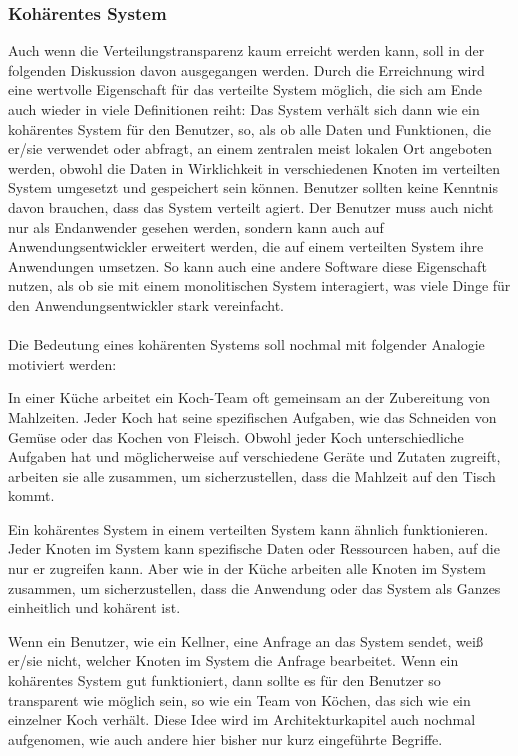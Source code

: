 \subsubsection{Kohärentes System}
Auch wenn die Verteilungstransparenz kaum erreicht werden kann, soll in der folgenden Diskussion davon ausgegangen werden. Durch die Erreichnung wird eine wertvolle Eigenschaft für das verteilte System möglich, die sich am Ende auch wieder in viele Definitionen reiht: Das System verhält sich dann wie ein kohärentes System für den Benutzer, so, als ob alle Daten und Funktionen, die er/sie verwendet oder abfragt, an einem zentralen meist lokalen Ort angeboten werden, obwohl die Daten in Wirklichkeit in verschiedenen Knoten im verteilten System umgesetzt und gespeichert sein können. Benutzer sollten keine Kenntnis davon brauchen, dass das System verteilt agiert. Der Benutzer muss auch nicht nur als Endanwender gesehen werden, sondern kann auch auf Anwendungsentwickler erweitert werden, die auf einem verteilten System ihre Anwendungen umsetzen. 
So kann auch eine andere Software diese Eigenschaft nutzen, als ob sie mit einem monolitischen System interagiert, was viele Dinge für den Anwendungsentwickler stark vereinfacht. 
\\\\
Die Bedeutung eines kohärenten Systems soll nochmal mit folgender Analogie motiviert werden:

In einer Küche arbeitet ein Koch-Team oft gemeinsam an der Zubereitung von Mahlzeiten. Jeder Koch hat seine spezifischen Aufgaben, wie das Schneiden von Gemüse oder das Kochen von Fleisch. Obwohl jeder Koch unterschiedliche Aufgaben hat und möglicherweise auf verschiedene Geräte und Zutaten zugreift, arbeiten sie alle zusammen, um sicherzustellen, dass die Mahlzeit auf den Tisch kommt.

Ein kohärentes System in einem verteilten System kann ähnlich funktionieren. Jeder Knoten im System kann spezifische Daten oder Ressourcen haben, auf die nur er zugreifen kann. Aber wie in der Küche arbeiten alle Knoten im System zusammen, um sicherzustellen, dass die Anwendung oder das System als Ganzes einheitlich und kohärent ist.

Wenn ein Benutzer, wie ein Kellner, eine Anfrage an das System sendet, weiß er/sie nicht, welcher Knoten im System die Anfrage bearbeitet. Wenn ein kohärentes System gut funktioniert, dann sollte es für den Benutzer so transparent wie möglich sein, so wie ein Team von Köchen, das sich wie ein einzelner Koch verhält. Diese Idee wird im Architekturkapitel auch nochmal aufgenomen, wie auch andere hier bisher nur kurz eingeführte Begriffe. 

